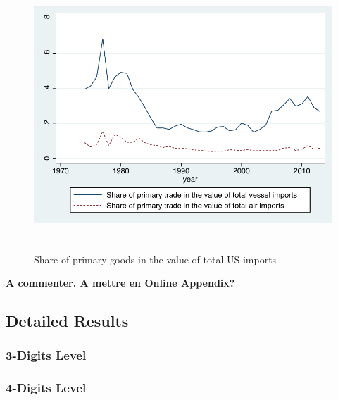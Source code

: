 \documentclass[11pt,twoside, authoryear]{elsarticle}
\begin{document}
\begin{figure}[htbp]
\caption{Share of primary goods in the value of total US imports}
\label{fig:Share_prim_goods}
\begin{center}
\includegraphics[height=4in]
{Share_of_primary.pdf}
\end{center}
\end{figure}

\textbf{A commenter. A mettre en Online Appendix?}






\subsection{Detailed Results \label{secoa:detailed}}
\setcounter{table}{0}
\renewcommand{\thetable}{B.\arabic{table}}


\subsubsection{3-Digits Level}

\subsubsection{4-Digits Level}
\end{document}
